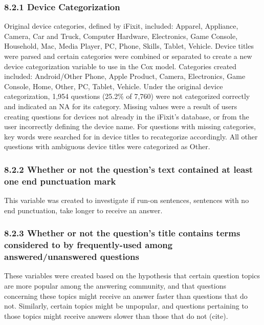 \documentclass{article}
\begin{document}
\subsubsection*{8.2.1 Device Categorization}

Original device categories, defined by iFixit, included: Apparel, Appliance, Camera, Car and Truck, Computer Hardware, Electronics, Game Console, Household, Mac, Media Player, PC, Phone, Skills, Tablet, Vehicle. Device titles were parsed and certain categories were combined or separated to create a new device categorization variable to use in the Cox model. Categories created included: Android/Other Phone, Apple Product, Camera, Electronics, Game Console, Home, Other, PC, Tablet, Vehicle. Under the original device categorization, 1,954 questions (25.2\% of 7,760) were not categorized correctly and indicated an NA for its category. Missing values were a result of users creating questions for devices not already in the iFixit's database, or from the user incorrectly defining the device name. For questions with missing categories, key words were searched for in device titles to recategorize accordingly. All other questions with ambiguous device titles were categorized as Other. 


\subsubsection*{8.2.2 Whether or not the question's text contained at least one end punctuation mark}

This variable was created to investigate if run-on sentences, sentences with no end punctuation, take longer to receive an answer.


\subsubsection*{8.2.3 Whether or not the question's title contains terms considered to by frequently-used among answered/unanswered questions}

These variables were created based on the hypothesis that certain question topics are more popular among the answering community, and that questions concerning these topics might receive an answer faster than questions that do not. Similarly, certain topics might be unpopular, and questions pertaining to those topics might receive answers slower than those that do not (cite).
\end{document}
